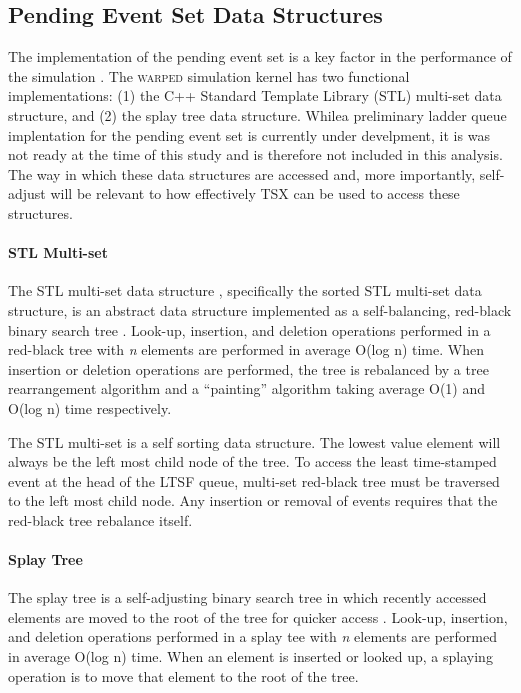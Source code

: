 \documentclass[11pt]{book}
\begin{document}

\subsection{Pending Event Set Data Structures}

The implementation of the pending event set is a key factor in the performance of the
simulation \cite{twpes}.  The \textsc{warped} simulation kernel has two functional
implementations: (1) the C++ Standard Template Library (STL) multi-set data structure, and
(2) the splay tree data structure.  Whilea preliminary ladder queue \cite{tang-05}
implentation for the pending event set is currently under develpment, it is was not ready
at the time of this study and is therefore not included in this analysis.  The way in
which these data structures are accessed and, more importantly, self-adjust will be
relevant to how effectively TSX can be used to access these structures.

\paragraph{STL Multi-set}

The STL multi-set data structure , specifically the sorted STL multi-set data structure,
is an abstract data structure implemented as a self-balancing, red-black binary search
tree \cite{redblack}.  Look-up, insertion, and deletion operations performed in a
red-black tree with \emph{n} elements are performed in average O(log n) time.  When
insertion or deletion operations are performed, the tree is rebalanced by a tree
rearrangement algorithm and a ``painting'' algorithm taking average O(1) and O(log n) time
respectively.

The STL multi-set is a self sorting data structure.  The lowest value element will always
be the left most child node of the tree.  To access the least time-stamped event at the
head of the LTSF queue, multi-set red-black tree must be traversed to the left most child
node.  Any insertion or removal of events requires that the red-black tree rebalance
itself.

\paragraph{Splay Tree}

The splay tree is a self-adjusting binary search tree in which recently accessed elements
are moved to the root of the tree for quicker access \cite{splaytree}.  Look-up,
insertion, and deletion operations performed in a splay tee with \emph{n} elements are
performed in average O(log n) time.  When an element is inserted or looked up, a splaying
operation is to move that element to the root of the tree.
\end{document}
